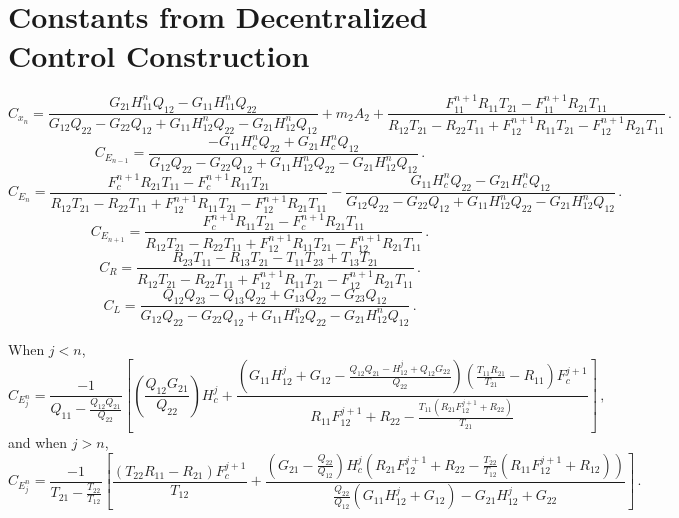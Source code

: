 \documentclass[11pt]{ucthesis}
\begin{document}
\chapter{Constants from Decentralized Control Construction}
\[
C_{x_n} = \frac{G_{21}H_{11}^nQ_{12}-G_{11}H_{11}^nQ_{22}}{G_{12}Q_{22}-G_{22}Q_{12}+G_{11}H_{12}^nQ_{22}-G_{21}H_{12}^nQ_{12}}+m_2A_2+\frac{F_{11}^{n+1}R_{11}T_{21}-F_{11}^{n+1}R_{21}T_{11}}{R_{12}T_{21}-R_{22}T_{11}+F_{12}^{n+1}R_{11}T_{21}-F_{12}^{n+1}R_{21}T_{11}} \,.
\]
\[
C_{E_{n-1}}= \frac{-G_{11}H_c^nQ_{22}+G_{21}H_c^nQ_{12}}{G_{12}Q_{22}-G_{22}Q_{12}+G_{11}H_{12}^nQ_{22}-G_{21}H_{12}^nQ_{12}} \,.
\]
\[
C_{E_n} = \frac{F_c^{n+1}R_{21}T_{11}-F_c^{n+1}R_{11}T_{21}}{R_{12}T_{21}-R_{22}T_{11}+F_{12}^{n+1}R_{11}T_{21}-F_{12}^{n+1}R_{21}T_{11}}-\frac{G_{11}H_c^nQ_{22}-G_{21}H_c^nQ_{12}}{G_{12}Q_{22}-G_{22}Q_{12}+G_{11}H_{12}^nQ_{22}-G_{21}H_{12}^nQ_{12}} \,.
\]
\[
C_{E_{n+1}} = \frac{F_c^{n+1}R_{11}T_{21}-F_c^{n+1}R_{21}T_{11}}{R_{12}T_{21}-R_{22}T_{11}+F_{12}^{n+1}R_{11}T_{21}-F_{12}^{n+1}R_{21}T_{11}} \,.
\]
\[
C_R = \frac{R_{23}T_{11}-R_{13}T_{21}-T_{11}T_{23}+T_{13}T_{21}}{R_{12}T_{21}-R_{22}T_{11}+F_{12}^{n+1}R_{11}T_{21}-F_{12}^{n+1}R_{21}T_{11}} \,.
\]
\[
C_L = \frac{Q_{12}Q_{23}-Q_{13}Q_{22}+G_{13}Q_{22}-G_{23}Q_{12}}{G_{12}Q_{22}-G_{22}Q_{12}+G_{11}H_{12}^nQ_{22}-G_{21}H_{12}^nQ_{12}} \,.
\]

When $j<n$,
\[
C_{E_j^n} = \frac{-1}{Q_{11}-\frac{Q_{12}Q_{21}}{Q_{22}}}\left[\left(\frac{Q_{12}G_{21}}{Q_{22}}\right)H_c^j+\frac{\left(G_{11}H_{12}^j+G_{12}-\frac{Q_{12}Q_{21}-H_{12}^j+Q_{12}G_{22}}{Q_{22}}\right)\left(\frac{T_{11}R_{21}}{T_{21}}-R_{11}\right)F_c^{j+1}}{R_{11}F_{12}^{j+1}+R_{22}-\frac{T_{11}(R_{21}F_{12}^{j+1}+R_{22})}{T_{21}}}\right] \,,
\]
and when $j>n$,
\[
C_{E_j^n} = \frac{-1}{T_{21}-\frac{T_{22}}{T_{12}}}\left[\frac{(T_{22}R_{11}-R_{21})F_c^{j+1}}{T_{12}}+\frac{\left(G_{21}-\frac{Q_{22}}{Q_{12}}\right)H_c^j\left(R_{21}F_{12}^{j+1}+R_{22}-\frac{T_{22}}{T_{12}}\left(R_{11}F_{12}^{j+1}+R_{12}\right)\right)}{\frac{Q_{22}}{Q_{12}}\left(G_{11}H_{12}^j+G_{12}\right)-G_{21}H_{12}^j+G_{22}}\right] \,.
\]
\end{document}

